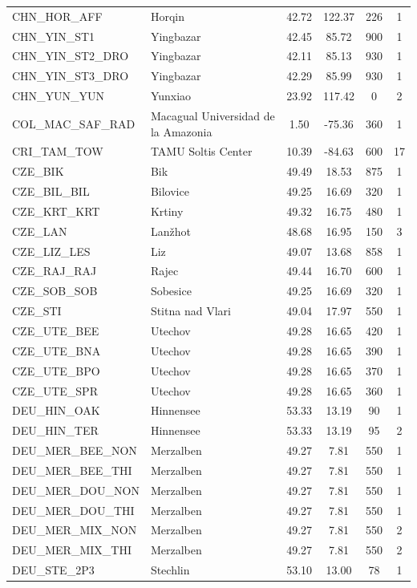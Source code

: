 \documentclass[11pt,twoside]{reedthesis}
\begin{document}
\begin{longtable}[t]{l>{\centering\arraybackslash}p{12em}cccc}
CHN\_HOR\_AFF & Horqin & 42.72 & 122.37 & 226 & 1\\
CHN\_YIN\_ST1 & Yingbazar & 42.45 & 85.72 & 900 & 1\\
CHN\_YIN\_ST2\_DRO & Yingbazar & 42.11 & 85.13 & 930 & 1\\
CHN\_YIN\_ST3\_DRO & Yingbazar & 42.29 & 85.99 & 930 & 1\\
CHN\_YUN\_YUN & Yunxiao & 23.92 & 117.42 & 0 & 2\\
COL\_MAC\_SAF\_RAD & Macagual Universidad de la Amazonia & 1.50 & -75.36 & 360 & 1\\
CRI\_TAM\_TOW & TAMU Soltis Center & 10.39 & -84.63 & 600 & 17\\
CZE\_BIK & Bik & 49.49 & 18.53 & 875 & 1\\
CZE\_BIL\_BIL & Bilovice & 49.25 & 16.69 & 320 & 1\\
CZE\_KRT\_KRT & Krtiny & 49.32 & 16.75 & 480 & 1\\
CZE\_LAN & Lanžhot & 48.68 & 16.95 & 150 & 3\\
CZE\_LIZ\_LES & Liz & 49.07 & 13.68 & 858 & 1\\
CZE\_RAJ\_RAJ & Rajec & 49.44 & 16.70 & 600 & 1\\
CZE\_SOB\_SOB & Sobesice & 49.25 & 16.69 & 320 & 1\\
CZE\_STI & Stitna nad Vlari & 49.04 & 17.97 & 550 & 1\\
CZE\_UTE\_BEE & Utechov & 49.28 & 16.65 & 420 & 1\\
CZE\_UTE\_BNA & Utechov & 49.28 & 16.65 & 390 & 1\\
CZE\_UTE\_BPO & Utechov & 49.28 & 16.65 & 370 & 1\\
CZE\_UTE\_SPR & Utechov & 49.28 & 16.65 & 360 & 1\\
DEU\_HIN\_OAK & Hinnensee & 53.33 & 13.19 & 90 & 1\\
DEU\_HIN\_TER & Hinnensee & 53.33 & 13.19 & 95 & 2\\
DEU\_MER\_BEE\_NON & Merzalben & 49.27 & 7.81 & 550 & 1\\
DEU\_MER\_BEE\_THI & Merzalben & 49.27 & 7.81 & 550 & 1\\
DEU\_MER\_DOU\_NON & Merzalben & 49.27 & 7.81 & 550 & 1\\
DEU\_MER\_DOU\_THI & Merzalben & 49.27 & 7.81 & 550 & 1\\
DEU\_MER\_MIX\_NON & Merzalben & 49.27 & 7.81 & 550 & 2\\
DEU\_MER\_MIX\_THI & Merzalben & 49.27 & 7.81 & 550 & 2\\
DEU\_STE\_2P3 & Stechlin & 53.10 & 13.00 & 78 & 1\\

\end{longtable}
\end{document}
